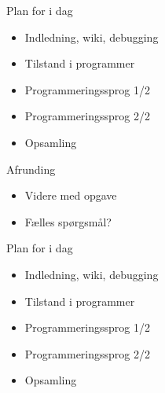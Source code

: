 \documentclass[a4paper,landscape]{slides}
\begin{document}
\begin{slide}
	\begin{center} {\large 
            Plan for i dag
	} \end{center}
	\begin{itemize} \addtolength{\itemsep}{-\baselineskip}
            \item Indledning, wiki, debugging
            \item Tilstand i programmer
            \item Programmeringssprog 1/2
            \item Programmeringssprog 2/2
            \item Opsamling
	\end{itemize}
\end{slide}

\begin{slide}
	\begin{center} {\large 
            Afrunding
	} \end{center}
	\begin{itemize} \addtolength{\itemsep}{-\baselineskip}
            \item Videre med opgave
            \item Fælles spørgsmål?
	\end{itemize}
\end{slide}

\begin{slide}
	\begin{center} {\large 
            Plan for i dag
	} \end{center}
	\begin{itemize} \addtolength{\itemsep}{-\baselineskip}
            \item Indledning, wiki, debugging
            \item Tilstand i programmer
            \item Programmeringssprog 1/2
            \item Programmeringssprog 2/2
            \item Opsamling
	\end{itemize}
\end{slide}
\end{document}
